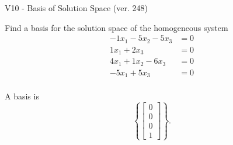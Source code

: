\begin{exercise}
  \begin{exerciseTitle}V10 - Basis of Solution Space (ver. 248)\end{exerciseTitle}
  \begin{exerciseStatement}
    Find a basis for the solution space of the homogeneous system 
\begin{align*}
 -1 x_ 1 -5 x_ 2 -5 x_ 3 &= 0  \\ 
  1 x_ 1 + 2 x_ 3 &= 0  \\ 
  4 x_ 1 + 1 x_ 2 -6 x_ 3 &= 0  \\ 
  -5 x_ 1 + 5 x_ 3 &= 0  \\ 
 \end{align*}


 
  \end{exerciseStatement}

  \begin{exerciseAnswer}
   A basis is   
\[\left\{\left[\begin{array}{c}
0 \\
0 \\
0 \\
1
\end{array}\right]\right\}.\]

  


  \end{exerciseAnswer}
\end{exercise}